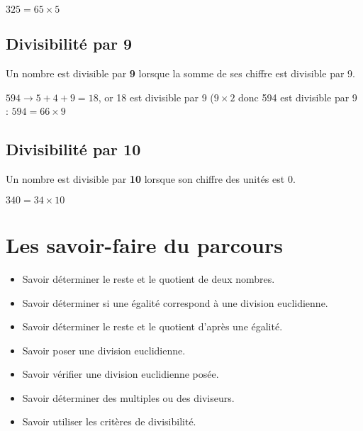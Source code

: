 \documentclass[a4paper,dvipsnames]{article}
\begin{document}
\begin{Ex}
\(325 = 65\times5\)
\end{Ex} 

\subsection{Divisibilité par 9}

\begin{Pp}
Un nombre est divisible par \textbf{9} lorsque la somme de ses chiffre est divisible par 9.
\end{Pp}

\begin{Ex}
\(594 \rightarrow 5+4+9 = 18\), or 18 est divisible par 9 (\(9\times2\) donc 594 est divisible par 9 : \(594=66\times9\)
\end{Ex}

\subsection{Divisibilité par 10}

\begin{Pp}
Un nombre est divisible par \textbf{10} lorsque son chiffre des unités est 0.
\end{Pp}

\begin{Ex}
$340=34\times10$
\end{Ex}

\section{Les savoir-faire du parcours}

\begin{CpsCol}
\begin{itemize}
\item Savoir déterminer le reste et le quotient de deux nombres.
\item Savoir déterminer si une égalité correspond à une division euclidienne.
\item Savoir déterminer le reste et le quotient d'après une égalité.
\item Savoir poser une division euclidienne.
\item Savoir vérifier une division euclidienne posée.
\item Savoir déterminer des multiples ou des diviseurs.
\item Savoir utiliser les critères de divisibilité.
\end{itemize}
\end{CpsCol}
\end{document}

